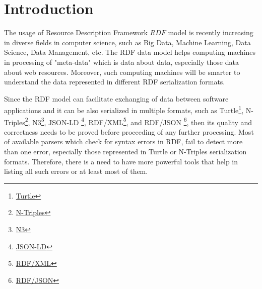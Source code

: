 \chapter{Introduction}
\label{ch:introduction}

%
%
%
%
%
%
%
%
%




\par The usage of Resource Description Framework \(RDF\) model is recently increasing in diverse fields in computer science, such as Big Data, Machine Learning, Data Science, Data Management, etc. The RDF data model helps computing machines in processing of "meta-data" which is data about data, especially those data about web resources. Moreover, such computing machines will be smarter to understand the data represented in different RDF serialization formats. 

Since the RDF model can facilitate  exchanging of data between software applications and it can be also serialized in multiple formats, such as Turtle\footnote{\href{https://www.w3.org/TR/turtle/}{Turtle}}, N-Triples\footnote{\href{https://www.w3.org/TR/n-triples/}{N-Triples}}, N3\footnote{\href{https://www.w3.org/TeamSubmission/n3/}{N3}}, JSON-LD	\footnote{\href{https://www.w3.org/2018/jsonld-cg-reports/json-ld/}{JSON-LD}}, RDF{/}XML\footnote{\href{https://www.w3.org/TR/rdf-syntax-grammar/}{RDF{/}XML}}, and RDF{/}JSON	\footnote{\href{https://dvcs.w3.org/hg/rdf/raw-file/default/rdf-json/index.html}{RDF{/}JSON}}, then its  quality and correctness needs to be proved before proceeding of any further processing. Most of available  parsers which check for syntax errors in RDF, fail to detect more than one error, especially those represented in Turtle or N-Triples serialization formats. Therefore, there is a need to have more powerful tools that help in listing all such errors or at least most of them.%


